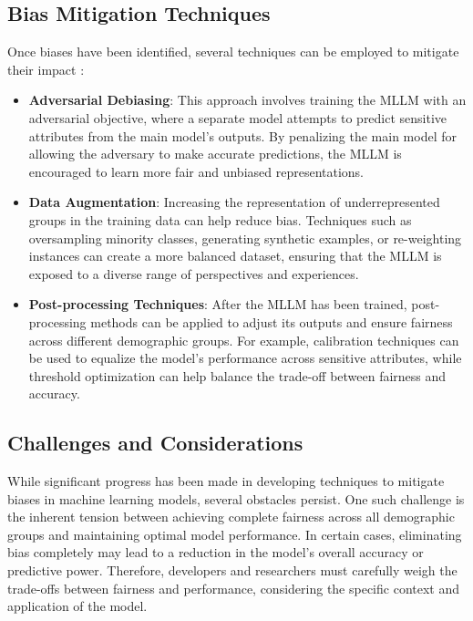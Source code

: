 \subsection{Bias Mitigation Techniques}

Once biases have been identified, several techniques can be employed to mitigate their impact \cite{tripathi2024insaaf, lee2024life}:

\begin{itemize}
    \item \textbf{Adversarial Debiasing}: This approach involves training the MLLM with an adversarial objective, where a separate model attempts to predict sensitive attributes from the main model's outputs. By penalizing the main model for allowing the adversary to make accurate predictions, the MLLM is encouraged to learn more fair and unbiased representations.
    
    \item \textbf{Data Augmentation}: Increasing the representation of underrepresented groups in the training data can help reduce bias. Techniques such as oversampling minority classes, generating synthetic examples, or re-weighting instances can create a more balanced dataset, ensuring that the MLLM is exposed to a diverse range of perspectives and experiences.
    
    \item \textbf{Post-processing Techniques}: After the MLLM has been trained, post-processing methods can be applied to adjust its outputs and ensure fairness across different demographic groups. For example, calibration techniques can be used to equalize the model's performance across sensitive attributes, while threshold optimization can help balance the trade-off between fairness and accuracy.
\end{itemize}


\subsection{Challenges and Considerations}

While significant progress has been made in developing techniques to mitigate biases in machine learning models, several obstacles persist. One such challenge is the inherent tension between achieving complete fairness across all demographic groups and maintaining optimal model performance. In certain cases, eliminating bias completely may lead to a reduction in the model's overall accuracy or predictive power. Therefore, developers and researchers must carefully weigh the trade-offs between fairness and performance, considering the specific context and application of the model.

